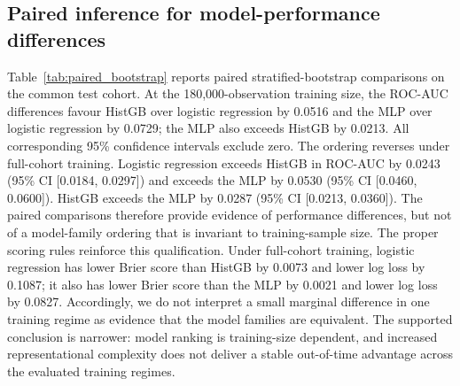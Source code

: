 \documentclass[10pt]{article}
\begin{document}
\begin{table}[!htbp]
\centering\small
\caption{Original 150-feature versus payment-date-quarantined 145-feature test performance (seed 42; same selected test cohort, $n=41{,}145$). AUC difference is 145 minus 150; smaller Brier is better.}
\label{tab:145_quarantine}
\end{table}

\subsection{Paired inference for model-performance differences}
\label{sec:pairedinference}

Table~\ref{tab:paired_bootstrap} reports paired stratified-bootstrap comparisons on the common test cohort. At the 180,000-observation training size, the ROC-AUC differences favour HistGB over logistic regression by 0.0516 and the MLP over logistic regression by 0.0729; the MLP also exceeds HistGB by 0.0213. All corresponding 95\% confidence intervals exclude zero. The ordering reverses under full-cohort training. Logistic regression exceeds HistGB in ROC-AUC by 0.0243 (95\% CI [0.0184, 0.0297]) and exceeds the MLP by 0.0530 (95\% CI [0.0460, 0.0600]). HistGB exceeds the MLP by 0.0287 (95\% CI [0.0213, 0.0360]). The paired comparisons therefore provide evidence of performance differences, but not of a model-family ordering that is invariant to training-sample size. The proper scoring rules reinforce this qualification. Under full-cohort training, logistic regression has lower Brier score than HistGB by 0.0073 and lower log loss by 0.1087; it also has lower Brier score than the MLP by 0.0021 and lower log loss by 0.0827. Accordingly, we do not interpret a small marginal difference in one training regime as evidence that the model families are equivalent. The supported conclusion is narrower: model ranking is training-size dependent, and increased representational complexity does not deliver a stable out-of-time advantage across the evaluated training regimes.
\end{document}
